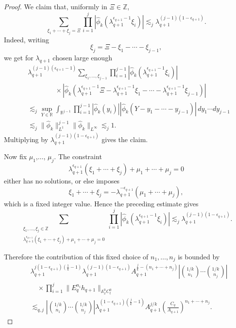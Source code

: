 \documentclass[12pt,reqno,letterpaper]{amsart}
\numberwithin{equation}{section}
\newcommand{\1}{{\bf 1}}
\newcommand{\2}{{\bf 2}}
\theoremstyle{remark}
\theoremstyle{remark}
\begin{document}
\begin{proof}
We claim that, uniformly in $\Xi\in\mathbb Z$,
\[
\sum_{\xi_1+\cdots+\xi_j=\Xi}
\prod_{i=1}^j
\left|
\hat{\phi}_k
\left(\lambda_{q+1}^{\epsilon_{q+1}-1}\xi_i\right)
\right|
\lesssim_j
\lambda_{q+1}^{(j-1)(1-\epsilon_{q+1})}.
\]
Indeed, writing
\[
    \xi_j=\Xi-\xi_1-\cdots-\xi_{j-1},
\]
we get for $\lambda_{q+1}$ chosen large enough
\begin{equation}\label{eq:page_32_conv_est}
    \begin{split}
        &\lambda_{q+1}^{(j-1)(\epsilon_{q+1}-1)}
\sum_{\xi_1,\ldots,\xi_{j-1}}
\prod_{i=1}^{j-1}
\left|
\hat{\phi}_k
\left(\lambda_{q+1}^{\epsilon_{q+1}-1}\xi_i\right)
\right|
\\
&\qquad\qquad\times
\left|
\hat{\phi}_k
\left(
\lambda_{q+1}^{\epsilon_{q+1}-1}\Xi
-
\lambda_{q+1}^{\epsilon_{q+1}-1}\xi_1
-\cdots
-\lambda_{q+1}^{\epsilon_{q+1}-1}\xi_{j-1}
\right)
\right|
\\
&\lesssim_j
\sup_{Y\in\mathbb R}
\int_{\mathbb R^{j-1}}
\prod_{i=1}^{j-1}
|\hat{\phi}_k(y_i)|
\left|
\hat{\phi}_k
\left(
Y-y_1-\cdots-y_{j-1}
\right)
\right|
\,dy_1\cdots dy_{j-1}
\\
&\lesssim_j
\|\hat{\phi}_k\|_{L^1}^{j-1}
\|\hat{\phi}_k\|_{L^\infty}
\lesssim_j 1.
    \end{split}
\end{equation}
Multiplying by $\lambda_{q+1}^{(j-1)(1-\epsilon_{q+1})}$ gives the claim.

Now fix $\mu_1$,$\ldots$, $\mu_j$. The constraint
\[
\lambda_{q+1}^{\epsilon_{q+1}}(\xi_1+\cdots+\xi_j)
+
\mu_1+\cdots+\mu_j=0
\]
either has no solutions, or else imposes
\[
    \xi_1+\cdots+\xi_j
    =
    -\lambda_{q+1}^{-\epsilon_{q+1}}(\mu_1+\cdots+\mu_j),
\]
which is a fixed integer value. Hence the preceding estimate gives
\begin{equation*}
\sum_{\substack{\xi_1,\ldots,\xi_j\in\mathbb Z\\
\lambda_{q+1}^{\epsilon_{q+1}}(\xi_1+\cdots+\xi_j)
+
\mu_1+\cdots+\mu_j=0}}
\prod_{i=1}^j
\left|
\hat{\phi}_k
\left(\lambda_{q+1}^{\epsilon_{q+1}-1}\xi_i\right)
\right| \lesssim_j
\lambda_{q+1}^{(j-1)(1-\epsilon_{q+1})}.
\end{equation*}

Therefore the contribution of this fixed choice of $n_1,\ldots,n_j$ is bounded by
\[
\begin{aligned}
&\lambda_{q+1}^{j(1-\epsilon_{q+1})(\frac1k-1)}
\lambda_{q+1}^{(j-1)(1-\epsilon_{q+1})}
A_{q+1}^{\frac jk-(n_1+\cdots+n_j)}
\left|
\binom{1/k}{n_1}\cdots\binom{1/k}{n_j}
\right|
\\
&\quad\times
\prod_{i=1}^j
\|E_q^{n_i}h_{q+1}\|_{\mathbb A_x^0C_t^0}
\\
&\lesssim_{q,j}
\left|
\binom{1/k}{n_1}\cdots\binom{1/k}{n_j}
\right|
\lambda_{q+1}^{(1-\epsilon_{q+1})(\frac jk-1)}
A_{q+1}^{j/k}
\left(\frac{C_q}{A_{q+1}}\right)^{n_1+\cdots+n_j}.
\end{aligned}
\]


\end{proof}
\end{document}

